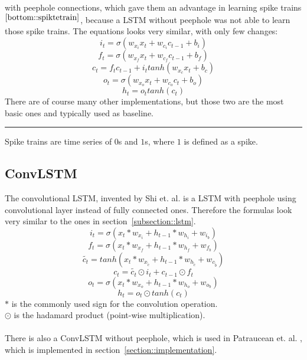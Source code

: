   with peephole connections, which gave them an advantage in learning spike trains$^{\ref{bottom::spiktetrain}}$, because a LSTM without peephole was not able to learn those spike trains.
  The equations looks very similar, with only few changes:
  \begin{equation}
   i_t = \sigma(w_{x_i}x_t + w_{c_i}c_{t-1} + b_i)
  \end{equation}
  \begin{equation}
   f_t = \sigma(w_{x_f}x_t + w_{c_f}c_{t-1} + b_f)
  \end{equation}
  \begin{equation}
   c_t = f_tc_{t-1} + i_ttanh(w_{x_c}x_t + b_c)
  \end{equation}
  \begin{equation}
   o_t = \sigma(w_{x_o}x_t + w_{c_o}c_t + b_o)
  \end{equation}
  \begin{equation}
   h_t = o_ttanh(c_t)
  \end{equation}
  There are of course many other implementations, but those two are the most basic ones and typically used as baseline.\\
  \noindent\rule{\textwidth}{1pt}
  \label{bottom::spiktetrain} Spike trains are time series of $0$s and $1$s, where $1$ is defined as a spike.
 \subsection{ConvLSTM} \label{subsection::convlstm}
  The convolutional LSTM, invented by Shi et. al. \cite{Shi2015} is a LSTM with peephole using convolutional layer instead of fully connected ones.
  Therefore the formulas look very similar to the ones in section~\ref{subsection::lstm}.
  \begin{equation}
   i_t = \sigma(x_t \ast w_{x_i} + h_{t-1} \ast w_{h_i} + w_{i_b})
  \end{equation}
  \begin{equation}
   f_t = \sigma(x_t \ast w_{x_f} + h_{t-1} \ast w_{h_f} + w_{f_b})
  \end{equation}
  \begin{equation}
   \tilde{c_t} = tanh(x_t \ast w_{x_{\tilde{c}}} + h_{t-1} \ast w_{h_{\tilde{c}}} + w_{c_{\tilde{b}}})
  \end{equation}
  \begin{equation}
   c_t = \tilde{c_t} \odot i_t + c_{t-1} \odot f_t
  \end{equation}
  \begin{equation}
   o_t = \sigma(x_t \ast w_{x_o} + h_{t-1} \ast w_{h_o} + w_{o_b})
  \end{equation}
  \begin{equation}
   h_t = o_t \odot tanh(c_t)
  \end{equation}
  $\ast$ is the commonly used sign for the convolution operation.\\
  $\odot$ is the hadamard product (point-wise multiplication).\\\\
  There is also a ConvLSTM without peephole, which is used in Patraucean et. al. \cite{Patraucean2015}, which is implemented in section~\ref{section::implementation}.
  
